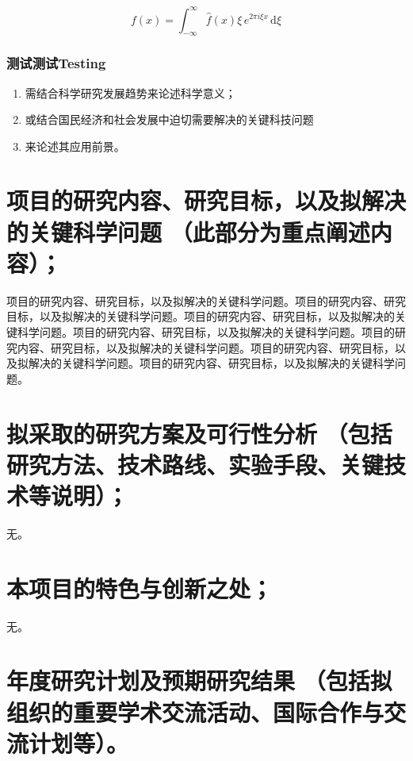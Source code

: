 \documentclass{nsfc}
\begin{document}
\begin{equation}\label{eq:1}
    f(x) = \int_{-\infty}^\infty  \hat f(x)\xi\,e^{2 \pi i \xi x}  \,\mathrm{d}\xi 
\end{equation}

\subsubsection{测试测试Testing}

\begin{enumerate}[1.]
    \item 需结合科学研究发展趋势来论述科学意义；
    \item 或结合国民经济和社会发展中迫切需要解决的关键科技问题
    \item 来论述其应用前景。
\end{enumerate}



\section{
    \textbf{项目的研究内容、研究目标，以及拟解决的关键科学问题}
    （此部分为重点阐述内容）；
}

项目的研究内容、研究目标，以及拟解决的关键科学问题。项目的研究内容、研究目标，以及拟解决的关键科学问题。项目的研究内容、研究目标，以及拟解决的关键科学问题。项目的研究内容、研究目标，以及拟解决的关键科学问题。项目的研究内容、研究目标，以及拟解决的关键科学问题。项目的研究内容、研究目标，以及拟解决的关键科学问题。项目的研究内容、研究目标，以及拟解决的关键科学问题。

\section{
    \textbf{拟采取的研究方案及可行性分析}
    （包括研究方法、技术路线、实验手段、关键技术等说明）；
}

无。

\section{
    \textbf{本项目的特色与创新之处；}
}

无。

\section{
    \textbf{年度研究计划及预期研究结果}
    （包括拟组织的重要学术交流活动、国际合作与交流计划等）。
}
\end{document}
